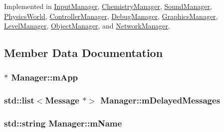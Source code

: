 Implemented in \hyperlink{classInputManager_aa5480931dba2720e7d80dd00a53adae0}{Input\+Manager}, \hyperlink{classChemistryManager_aa65a3231440bbab7f588f136c0439fee}{Chemistry\+Manager}, \hyperlink{classSoundManager_aaf241621221cdbefeba78e8b6bc29240}{Sound\+Manager}, \hyperlink{classPhysicsWorld_a8cb6d48d4de75cabc4e3943b16666200}{Physics\+World}, \hyperlink{classControllerManager_a8f59b1425c2dc17c1fd93875230f714c}{Controller\+Manager}, \hyperlink{classDebugManager_ac38c481d6098016147998e4600d1fbbf}{Debug\+Manager}, \hyperlink{classGraphicsManager_a84004634b1d8d0435f6adfaaf6b3d4b4}{Graphics\+Manager}, \hyperlink{classLevelManager_a7800611361e7c2ae99102e69429456fc}{Level\+Manager}, \hyperlink{classObjectManager_ac6035906749a40ec3a1d685ebed11c89}{Object\+Manager}, and \hyperlink{classNetworkManager_ad71efb4104426ea7201edaff52ba9a00}{Network\+Manager}.



\subsection{Member Data Documentation}
\subsubsection[{\texorpdfstring{m\+App}{mApp}}]{$\ast$ Manager\+::m\+App\hspace{0.3cm}{\ttfamily [private]}}\hypertarget{classManager_a36229c6d248b1d9db13c463e0fe3cb57}{}\label{classManager_a36229c6d248b1d9db13c463e0fe3cb57}
\subsubsection[{\texorpdfstring{m\+Delayed\+Messages}{mDelayedMessages}}]{\setlength{\rightskip}{0pt plus 5cm}std\+::list$<${\bf Message} $\ast$$>$ Manager\+::m\+Delayed\+Messages}\hypertarget{classManager_a2bc4fe3e13417022d2a12249dd4997eb}{}\label{classManager_a2bc4fe3e13417022d2a12249dd4997eb}
\subsubsection[{\texorpdfstring{m\+Name}{mName}}]{\setlength{\rightskip}{0pt plus 5cm}std\+::string Manager\+::m\+Name\hspace{0.3cm}{\ttfamily [private]}}\hypertarget{classManager_a126bbe95ad1a955a50d79560c3a01c4f}{}\label{classManager_a126bbe95ad1a955a50d79560c3a01c4f}
